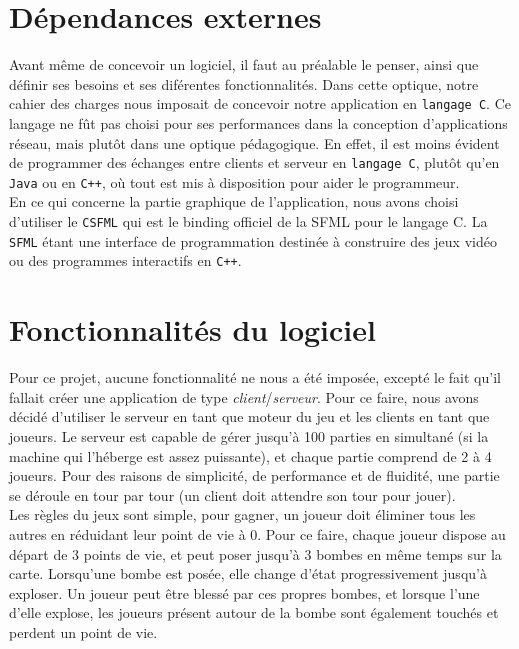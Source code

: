 \section*{Dépendances externes}

	Avant même de concevoir un logiciel, il faut au préalable le penser, ainsi que définir ses besoins et ses diférentes fonctionnalités. Dans cette optique, notre cahier des charges nous imposait de concevoir notre application en \texttt{langage C}. Ce langage ne fût pas choisi pour ses performances dans la conception d'applications réseau, mais plutôt dans une optique pédagogique. En effet, il est moins évident de programmer des échanges entre clients et serveur en \texttt{langage C}, plutôt qu'en \texttt{Java} ou en \texttt{C++}, où tout est mis à disposition pour aider le programmeur.\\

	En ce qui concerne la partie graphique de l'application, nous avons choisi d'utiliser le \texttt{CSFML} qui est le binding officiel de la SFML pour le langage C. La \texttt{SFML} étant une interface de programmation destinée à construire des jeux vidéo ou des programmes interactifs en \texttt{C++}.

\section*{Fonctionnalités du logiciel}

	Pour ce projet, aucune fonctionnalité ne nous a été imposée, excepté le fait qu'il fallait créer une application de type \textit{client}/\textit{serveur}. Pour ce faire, nous avons décidé d'utiliser le serveur en tant que moteur du jeu et les clients en tant que joueurs. Le serveur est capable de gérer jusqu'à 100 parties en simultané (si la machine qui l'héberge est assez puissante), et chaque partie comprend de 2 à 4 joueurs. Pour des raisons de simplicité, de performance et de fluidité, une partie se déroule en tour par tour (un client doit attendre son tour pour jouer). \\

	Les règles du jeux sont simple, pour gagner, un joueur doit éliminer tous les autres en réduidant leur point de vie à 0. Pour ce faire, chaque joueur dispose au départ de 3 points de vie, et peut poser jusqu'à 3 bombes en même temps sur la carte. Lorsqu'une bombe est posée, elle change d'état progressivement jusqu'à exploser. Un joueur peut être blessé par ces propres bombes, et lorsque l'une d'elle explose, les joueurs présent autour de la bombe sont également touchés et perdent un point de vie.

